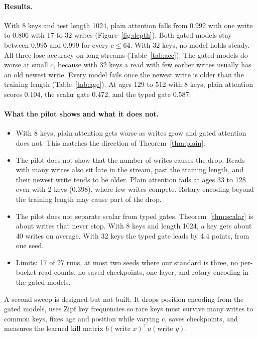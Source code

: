\documentclass[10pt]{article}
\theoremstyle{definition}
\theoremstyle{remark}
\begin{document}
\paragraph{Results.} With 8 keys and test length 1024, plain attention falls from 0.992 with one write to 0.806 with 17 to 32 writes (Figure~\ref{fig:depth}). Both gated models stay between 0.995 and 0.999 for every $c \le 64$. With 32 keys, no model holds steady. All three lose accuracy on long streams (Table~\ref{tab:acc}). The gated models do worse at small $c$, because with 32 keys a read with few earlier writes usually has an old newest write. Every model fails once the newest write is older than the training length (Table~\ref{tab:age}). At ages 129 to 512 with 8 keys, plain attention scores 0.104, the scalar gate 0.472, and the typed gate 0.587.

\paragraph{What the pilot shows and what it does not.}
\begin{itemize}
\item With 8 keys, plain attention gets worse as writes grow and gated attention does not. This matches the direction of Theorem~\ref{thm:plain}.
\item The pilot does not show that the number of writes causes the drop. Reads with many writes also sit late in the stream, past the training length, and their newest write tends to be older. Plain attention fails at ages 33 to 128 even with 2 keys (0.398), where few writes compete. Rotary encoding beyond the training length may cause part of the drop.
\item The pilot does not separate scalar from typed gates. Theorem~\ref{thm:scalar} is about writes that never stop. With 8 keys and length 1024, a key gets about 40 writes on average. With 32 keys the typed gate leads by 4.4 points, from one seed.
\item Limits: 17 of 27 runs, at most two seeds where our standard is three, no per-bucket read counts, no saved checkpoints, one layer, and rotary encoding in the gated models.
\end{itemize}
A second sweep is designed but not built. It drops position encoding from the gated models, uses Zipf key frequencies so rare keys must survive many writes to common keys, fixes age and position while varying $c$, saves checkpoints, and measures the learned kill matrix $b(\text{write } x)^\top u(\text{write } y)$.
\end{document}

